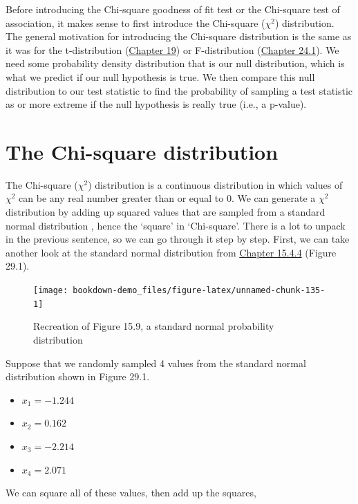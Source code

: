 \documentclass[
]{scrbook}
\providecommand{\tightlist}{%
  \setlength{\itemsep}{0pt}\setlength{\parskip}{0pt}}
\begin{document}
Before introducing the Chi-square goodness of fit test or the Chi-square test of association, it makes sense to first introduce the Chi-square (\(\chi^{2}\)) distribution.
The general motivation for introducing the Chi-square distribution is the same as it was for the t-distribution (\protect\hyperlink{Chapter_19}{Chapter 19}) or F-distribution (\protect\hyperlink{the-f-distribution}{Chapter 24.1}).
We need some probability density distribution that is our null distribution, which is what we predict if our null hypothesis is true.
We then compare this null distribution to our test statistic to find the probability of sampling a test statistic as or more extreme if the null hypothesis is really true (i.e., a p-value).

\hypertarget{the-chi-square-distribution}{%
\section{The Chi-square distribution}\label{the-chi-square-distribution}}

The Chi-square (\(\chi^{2}\)) distribution is a continuous distribution in which values of \(\chi^{2}\) can be any real number greater than or equal to 0. We can generate a \(\chi^{2}\) distribution by adding up squared values that are sampled from a standard normal distribution \citep{Sokal1995}, hence the `square' in `Chi-square'.
There is a lot to unpack in the previous sentence, so we can go through it step by step.
First, we can take another look at the standard normal distribution from \protect\hyperlink{normal-distribution}{Chapter 15.4.4} (Figure 29.1).

\begin{figure}
\texttt{[image: bookdown-demo\_files/figure-latex/unnamed-chunk-135-1]} \caption{Recreation of Figure 15.9, a standard normal probability distribution}\label{fig:unnamed-chunk-135}
\end{figure}

Suppose that we randomly sampled 4 values from the standard normal distribution shown in Figure 29.1.

\begin{itemize}
\tightlist
\item
  \(x_{1} = -1.244\)
\item
  \(x_{2} = 0.162\)
\item
  \(x_{3} = -2.214\)
\item
  \(x_{4} = 2.071\)
\end{itemize}

We can square all of these values, then add up the squares,
\end{document}
